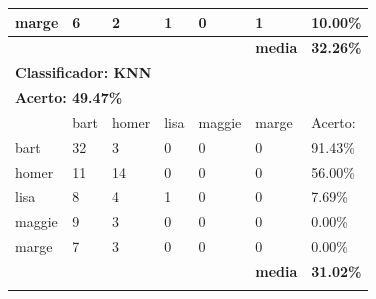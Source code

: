 \documentclass[journal]{IEEEtran}
\begin{document}
\begin{table}[!htb]
\begin{tabular}{l|l|l|l|l|l|l}
marge     & 6         & 2         & 1         & 0         & 1              & 10.00\%          \\ \hline
          &           &           &           &           & \textbf{media} & \textbf{32.26\%} \\ \hline
\multicolumn{7}{l}{\textbf{Classificador: KNN}}                                                \\ \hline
\multicolumn{7}{l}{\textbf{Acerto: 49.47\%}}                                                  \\ \hline
          & bart      & homer     & lisa      & maggie    & marge          & Acerto:            \\ \hline
bart      & 32        & 3         & 0         & 0         & 0              & 91.43\%          \\ \hline
homer     & 11        & 14        & 0         & 0         & 0              & 56.00\%          \\ \hline
lisa      & 8         & 4         & 1         & 0         & 0              & 7.69\%           \\ \hline
maggie    & 9         & 3         & 0         & 0         & 0              & 0.00\%           \\ \hline
marge     & 7         & 3         & 0         & 0         & 0              & 0.00\%           \\ \hline
          &           &           &           &           & \textbf{media} & \textbf{31.02\%} \\ \hline
\multicolumn{7}{l}{\multirow{2}{*}{}}                                                       \\
\end{tabular}
\end{table}
\end{document}
